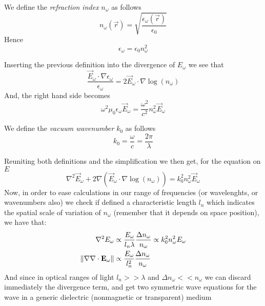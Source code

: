 \documentclass[../electromagnetism.tex]{subfiles}
\begin{document}
\begin{dfn}
	We define the \textit{refraction index} $n_\omega$ as follows
	\begin{equation}
		n_\omega(\vec{r})=\sqrt{\frac{\epsilon_\omega(\vec{r})}{\epsilon_0}}
		\label{eq:refractionind.waves}
	\end{equation}
	Hence
	\begin{equation*}
		\epsilon_\omega=\epsilon_0n_\omega^2
	\end{equation*}
\end{dfn}
Inserting the previous definition into the divergence of $E_\omega$ we see that
\begin{equation*}
	\frac{\vec{E}_\omega\cdot\nabla\epsilon_\omega}{\epsilon_\omega}=2\vec{E}_\omega\cdot\nabla\log\left( n_\omega \right)
\end{equation*}
And, the right hand side becomes
\begin{equation*}
	\omega^2\mu_0\epsilon_\omega\vec{E}_\omega=\frac{\omega^2}{c^2}n_\omega^2\vec{E}_\omega
\end{equation*}
\begin{dfn}[Wavenumber]
	We define the \textit{vacuum wavenumber} $k_0$ as follows
	\begin{equation}
		k_0=\frac{\omega}{c}=\frac{2\pi}{\lambda}
		\label{eq:wavenumber.waves}
	\end{equation}
\end{dfn}
Reuniting both definitions and the simplification we then get, for the equation on $E$
\begin{equation*}
	\nabla^2\vec{E}_\omega+2\nabla\left( \vec{E}_\omega\cdot\nabla\log(n_\omega) \right)=k_0^2n_\omega^2\vec{E}_\omega
\end{equation*}
Now, in order to ease calculations in our range of frequencies (or wavelenghts, or wavenumbers also) we check if defined a characteristic length $l_n$ which indicates the spatial scale of variation of $n_\omega$ (remember that it depends on space position), we have that:
\begin{equation*}
	\begin{aligned}
		\nabla^2E_\omega&\propto\frac{E_\omega}{l_n\lambda}\frac{\Delta n_\omega}{n_\omega}\propto k_0^2n_\omega^2E_\omega\\
		\norm{\nabla\nabla\cdot\mathbf{E}_\omega}&\propto\frac{E_\omega}{l_n^2}\frac{\Delta n_\omega}{n_\omega}
	\end{aligned}
\end{equation*}
And since in optical ranges of light $l_n>>\lambda$ and $\Delta n_\omega<<n_\omega$ we can discard immediately the divergence term, and get two symmetric wave equations for the wave in a generic dielectric (nonmagnetic or transparent) medium
\end{document}
